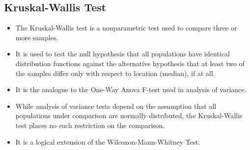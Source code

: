 \documentclass[12pt, a4paper]{report}
\theoremstyle{plain}
\theoremstyle{definition}
\theoremstyle{remark}
\begin{document}
\subsection*{Kruskal-Wallis Test}
\begin{itemize}
\item The Kruskal-Wallis test is a nonparametric test used to compare three or more samples.
\item It is used to
test the null hypothesis that all populations have identical distribution functions against the
alternative hypothesis that at least two of the samples differ only with respect to location (median),
if at all.
\item It is the analogue to the One-Way Anova F-test used in analysis of variance. 
\item While analysis of variance tests depend
on the assumption that all populations under comparison are normally distributed, the Kruskal-Wallis
test places no such restriction on the comparison.
\item It is a logical extension of the Wilcoxon-Mann-Whitney Test.
\end{itemize}
\end{document}
